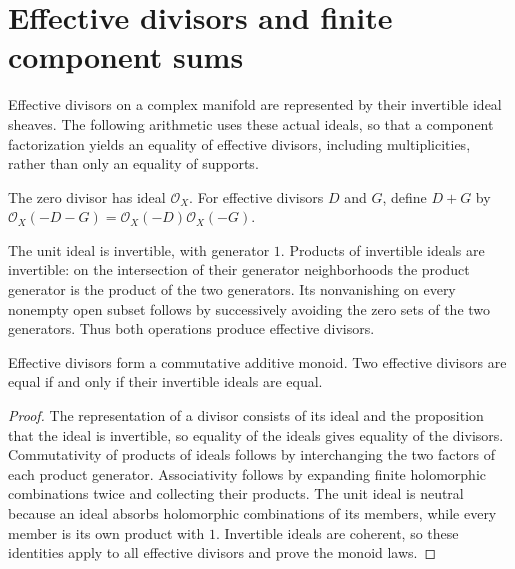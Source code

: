 \section{Effective divisors and finite component sums}

Effective divisors on a complex manifold are represented by their invertible
ideal sheaves. The following arithmetic uses these actual ideals, so that a
component factorization yields an equality of effective divisors, including
multiplicities, rather than only an equality of supports.

\begin{definition}
\label{hir:effective-divisor-addition}
The zero divisor has ideal $\mathcal O_X$. For effective divisors $D$ and $G$,
define $D+G$ by
$\mathcal O_X(-D-G)=\mathcal O_X(-D)\mathcal O_X(-G)$.
\leanok
\end{definition}
The unit ideal is invertible, with generator $1$. Products of invertible
ideals are invertible: on the intersection of their generator neighborhoods
the product generator is the product of the two generators. Its nonvanishing
on every nonempty open subset follows by successively avoiding the zero sets
of the two generators. Thus both operations produce effective divisors.

\begin{lemma}
\label{hir:effective-divisor-additive-monoid}
Effective divisors form a commutative additive monoid. Two effective divisors
are equal if and only if their invertible ideals are equal.
\leanok
\end{lemma}
\begin{proof}
The representation of a divisor consists of its ideal and the proposition
that the ideal is invertible, so equality of the ideals gives equality of
the divisors. Commutativity of products of ideals follows by interchanging
the two factors of each product generator. Associativity follows by
expanding finite holomorphic combinations twice and collecting their
products. The unit ideal is neutral because an ideal absorbs holomorphic
combinations of its members, while every member is its own product with
$1$. Invertible ideals are coherent, so these identities apply to all
effective divisors and prove the monoid laws.
\end{proof}

